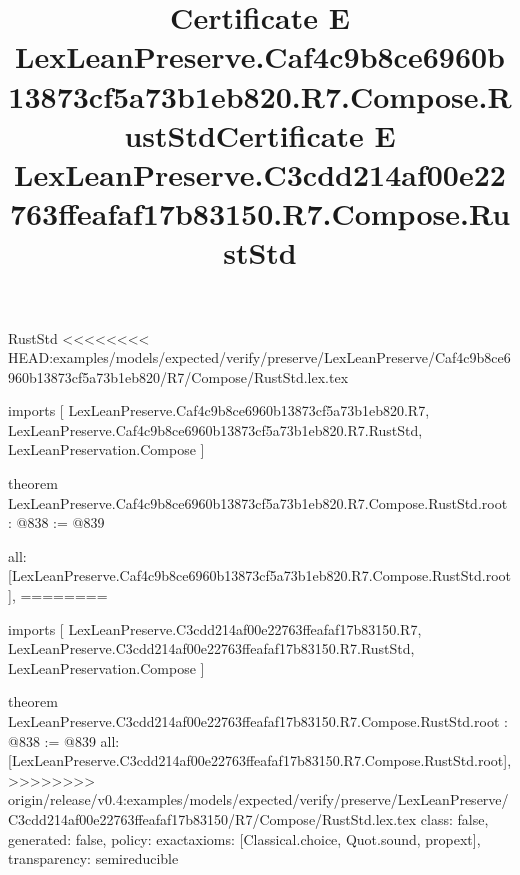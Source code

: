 \begin{lexlean}{RustStd}
<<<<<<<< HEAD:examples/models/expected/verify/preserve/LexLeanPreserve/Caf4c9b8ce6960b13873cf5a73b1eb820/R7/Compose/RustStd.lex.tex
\title{Certificate E LexLeanPreserve.Caf4c9b8ce6960b13873cf5a73b1eb820.R7.Compose.RustStd}
\begin{coremodule}
imports [
  LexLeanPreserve.Caf4c9b8ce6960b13873cf5a73b1eb820.R7,
  LexLeanPreserve.Caf4c9b8ce6960b13873cf5a73b1eb820.R7.RustStd,
  LexLeanPreservation.Compose
]

theorem LexLeanPreserve.Caf4c9b8ce6960b13873cf5a73b1eb820.R7.Compose.RustStd.root : @838 := @839 {
  all: [LexLeanPreserve.Caf4c9b8ce6960b13873cf5a73b1eb820.R7.Compose.RustStd.root],
========
\title{Certificate E LexLeanPreserve.C3cdd214af00e22763ffeafaf17b83150.R7.Compose.RustStd}
\begin{coremodule}
imports [
  LexLeanPreserve.C3cdd214af00e22763ffeafaf17b83150.R7,
  LexLeanPreserve.C3cdd214af00e22763ffeafaf17b83150.R7.RustStd,
  LexLeanPreservation.Compose
]

theorem LexLeanPreserve.C3cdd214af00e22763ffeafaf17b83150.R7.Compose.RustStd.root : @838 := @839 {
  all: [LexLeanPreserve.C3cdd214af00e22763ffeafaf17b83150.R7.Compose.RustStd.root],
>>>>>>>> origin/release/v0.4:examples/models/expected/verify/preserve/LexLeanPreserve/C3cdd214af00e22763ffeafaf17b83150/R7/Compose/RustStd.lex.tex
  class: false,
  generated: false,
  policy: exact{axioms: [Classical.choice, Quot.sound, propext]},
  transparency: semireducible
}


\end{coremodule}}
\end{coremodule}
\end{lexlean}
